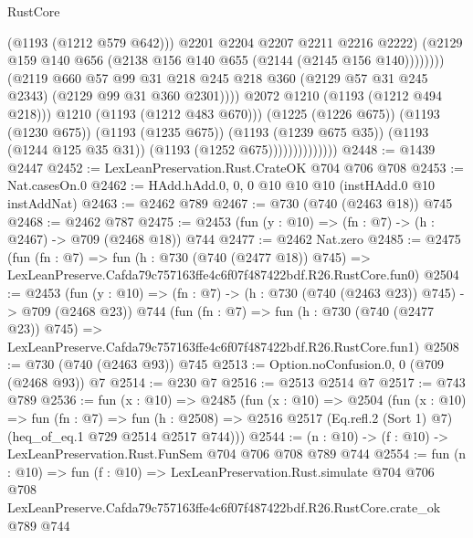 \begin{lexlean}{RustCore}
\begin{coremodule}
                                                (@1193 (@1212 @579 @642)))
                                              @2201
                                              @2204
                                              @2207
                                              @2211
                                              @2216
                                              @2222)
                                            (@2129
                                              @159
                                              @140
                                              @656
                                              (@2138 @156 @140 @655 (@2144 (@2145 @156 @140))))))))
                                    (@2119
                                      @660
                                      @57
                                      @99
                                      @31
                                      @218
                                      @245
                                      @218
                                      @360
                                      (@2129 @57 @31 @245 @2343)
                                      (@2129 @99 @31 @360 @2301))))
                                @2072
                                @1210
                                (@1193 (@1212 @494 @218)))
                              @1210
                              (@1193 (@1212 @483 @670)))
                            (@1225 (@1226 @675))
                            (@1193 (@1230 @675))
                            (@1193 (@1235 @675))
                            (@1193 (@1239 @675 @35))
                            (@1193 (@1244 @125 @35 @31))
                            (@1193 (@1252 @675))))))))))))))
@2448 := @1439 @2447
@2452 := LexLeanPreservation.Rust.CrateOK @704 @706 @708
@2453 := Nat.casesOn.{0}
@2462 := HAdd.hAdd.{0, 0, 0} @10 @10 @10 (instHAdd.{0} @10 instAddNat)
@2463 := @2462 @789
@2467 := @730 (@740 (@2463 @18)) @745
@2468 := @2462 @787
@2475 := @2453 (fun (y : @10) => (fn : @7) -> (h : @2467) -> @709 (@2468 @18)) @744
@2477 := @2462 Nat.zero
@2485 := @2475
    (fun (fn : @7) =>
    fun (h : @730 (@740 (@2477 @18)) @745) =>
    LexLeanPreserve.Cafda79c757163ffe4c6f07f487422bdf.R26.RustCore.fun0)
@2504 := @2453
    (fun (y : @10) => (fn : @7) -> (h : @730 (@740 (@2463 @23)) @745) -> @709 (@2468 @23))
    @744
    (fun (fn : @7) =>
    fun (h : @730 (@740 (@2477 @23)) @745) =>
    LexLeanPreserve.Cafda79c757163ffe4c6f07f487422bdf.R26.RustCore.fun1)
@2508 := @730 (@740 (@2463 @93)) @745
@2513 := Option.noConfusion.{0, 0} (@709 (@2468 @93)) @7
@2514 := @230 @7
@2516 := @2513 @2514 @7
@2517 := @743 @789
@2536 := fun (x : @10) =>
  @2485
    (fun (x : @10) =>
    @2504
      (fun (x : @10) =>
      fun (fn : @7) =>
      fun (h : @2508) =>
      @2516 @2517 (Eq.refl.{2} (Sort 1) @7) (heq_of_eq.{1} @729 @2514 @2517 @744)))
@2544 := (n : @10) -> (f : @10) -> LexLeanPreservation.Rust.FunSem @704 @706 @708 @789 @744
@2554 := fun (n : @10) =>
  fun (f : @10) =>
  LexLeanPreservation.Rust.simulate
    @704
    @706
    @708
    LexLeanPreserve.Cafda79c757163ffe4c6f07f487422bdf.R26.RustCore.crate_ok
    @789
    @744
\end{coremodule}
\end{lexlean}
